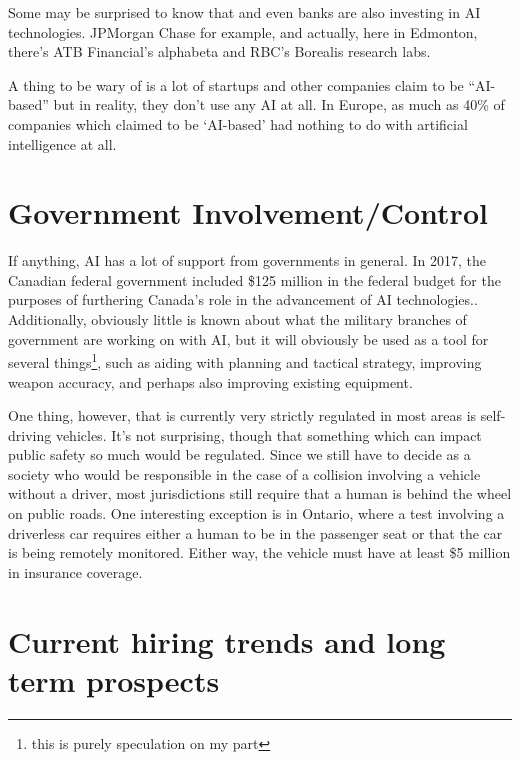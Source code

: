 \documentclass[letterpaper,12pt]{article}
\begin{document}
Some may be surprised to know that and even banks are also investing in AI technologies.
JPMorgan Chase for example, and actually, here in Edmonton, there's ATB Financial's alphabeta and RBC's
Borealis research labs.

A thing to be wary of is a lot of startups and other companies claim to be ``AI-based''
but in reality, they don't use any AI at all. In Europe, as much as 
40\% of companies which claimed to be `AI-based' had nothing to do
with artificial intelligence at all.
\cite{fakeaistartups}


\section{Government Involvement/Control}
If anything, AI has a lot of support from governments in general.
In 2017, the Canadian federal government included \$125 million in the
federal budget for the purposes of furthering Canada's role in the
advancement of AI technologies.\cite{canadafederalfunding}. 
Additionally, obviously little is known about what the military
branches of government are working on with AI, but it will obviously
be used as a tool for several things\footnote{this is purely speculation on my part},
such as aiding with 
planning and tactical strategy, improving weapon accuracy, and perhaps also improving
existing equipment.

One thing, however, that is currently very strictly regulated
in most areas is self-driving vehicles. It's not surprising,
though that something which can impact public safety so much
would be regulated. Since we still have to decide as a society
who would be responsible in the case of a collision
involving a vehicle without a driver, most
jurisdictions still require that a human is behind the wheel on public roads.
One interesting exception is in Ontario, where a test involving a driverless car
requires either a human to be in the passenger seat or that the car is being
remotely monitored. Either way, the vehicle must have at least \$5 million
in insurance coverage.\cite{ontariodriverless}

\section{Current hiring trends and long term prospects}
\end{document}
